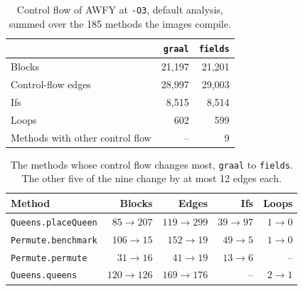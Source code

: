 \begin{table}[t]
    \centering
    \caption{Control flow of AWFY at \texttt{-O3}, default analysis, summed over the 185 methods the images compile.}
    \label{tab:eval-control}
    \footnotesize
    \begin{tabular}{lrr}
        \toprule
        & \texttt{graal} & \texttt{fields} \\
        \midrule
        Blocks                       & 21,197 & 21,201 \\
        Control-flow edges           & 28,997 & 29,003 \\
        Ifs                          &  8,515 &  8,514 \\
        Loops                        &    602 &    599 \\
        Methods with other control flow & -- & 9 \\
        \bottomrule
    \end{tabular}
\end{table}

\begin{table}[t]
    \centering
    \caption{The methods whose control flow changes most, \texttt{graal} to \texttt{fields}. The other five of the nine change
    by at most 12 edges each.}
    \label{tab:eval-control-methods}
    \footnotesize
    \begin{tabular}{lrrrr}
        \toprule
        Method & Blocks & Edges & Ifs & Loops \\
        \midrule
        \texttt{Queens.placeQueen}  & $85 \to 207$ & $119 \to 299$ & $39 \to 97$ & $1 \to 0$ \\
        \texttt{Permute.benchmark}  & $106 \to 15$ & $152 \to 19$  & $49 \to 5$  & $1 \to 0$ \\
        \texttt{Permute.permute}    & $31 \to 16$  & $41 \to 19$   & $13 \to 6$  & -- \\
        \texttt{Queens.queens}      & $120 \to 126$ & $169 \to 176$ & --          & $2 \to 1$ \\
        \bottomrule
    \end{tabular}
\end{table}

